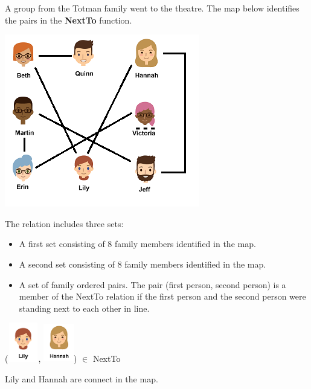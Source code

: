 \documentclass{ximera}
\begin{document}
\begin{definition}
  A group from the Totman family went to the theatre. The map below identifies the pairs in the \textbf{NextTo} function.
  
  

    \includegraphics[width=321px,height=285px]{pics/standinline.png}

  
 

  The  relation includes three sets:
    \begin{itemize}
    \item A first set consisting of 8 family members identified in the map.
    \item A second set consisting of 8 family members identified in the map.
    \item A set of family ordered pairs. The pair (first person, second person) is a member of the NextTo relation if the first person and the second person were standing next to each other in line.
    \end{itemize}

  
\end{definition}



\begin{exercise}
 ({\includegraphics[width=50px,height=65px]{pics/people/lily.png}}, {\includegraphics[width=50px,height=65px]{pics/people/hannah.png}}) $\in$ NextTo 

  \begin{multipleChoice}
  \end{multipleChoice}
  \begin{feedback}
Lily and Hannah are connect in the map.
  \end{feedback}
\end{exercise}
\end{document}
